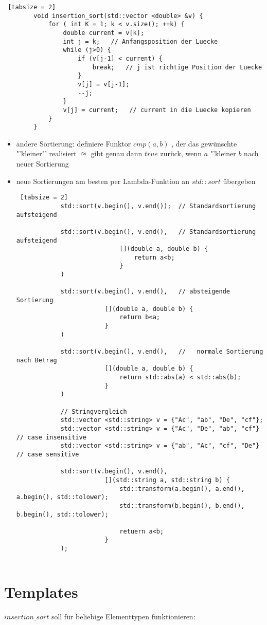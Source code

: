 \documentclass{article}
\begin{document}
	\begin{lstlisting} [tabsize = 2]
		void insertion_sort(std::vector <double> &v) {
			for ( int K = 1; k < v.size(); ++k) {
				double current = v[k];
				int j = k;   // Anfangsposition der Luecke
				while (j>0) {
					if (v[j-1] < current) {
						break;   // j ist richtige Position der Luecke
					}
					v[j] = v[j-1];
					--j;
				}
				v[j] = current;   // current in die Luecke kopieren
			}
		}
	\end{lstlisting}
	\begin{itemize}
		\item andere Sortierung: definiere Funktor $cmp(a,b)$ , der das gewünschte "'kleiner"' realisiert $\approxeq$ gibt genau dann $true$ zurück, wenn $a$ "'kleiner $b$ nach neuer Sortierung
		\item neue Sortierungen am besten per Lambda-Funktion an $std::sort$ übergeben
		\begin{lstlisting} [tabsize = 2]
			std::sort(v.begin(), v.end());  // Standardsortierung aufsteigend
			
			std::sort(v.begin(), v.end(),   // Standardsortierung aufsteigend
							[](double a, double b) {
								return a<b;
							}
			)
			
			std::sort(v.begin(), v.end(),   // absteigende Sortierung
						[](double a, double b) {
							return b<a;
						}
			)
						
			std::sort(v.begin(), v.end(),   //   normale Sortierung nach Betrag
						[](double a, double b) {
							return std::abs(a) < std::abs(b);
						}
			)
			
			// Stringvergleich 
			std::vector <std::string> v = {"Ac", "ab", "De", "cf"};  
			std::vector <std::string> v = {"Ac", "De", "ab", "cf"}  // case insensitive
			std::vector <std::string> v = {"ab", "Ac", "cf", "De"}  // case sensitive
			
			std::sort(v.begin(), v.end(), 
						[](std::string a, std::string b) {
							std::transform(a.begin(), a.end(), a.begin(), std::tolower);
							std::transform(b.begin(), b.end(), b.begin(), std::tolower);
							
							retuern a<b;
						}
			);
			
		\end{lstlisting}
	\end{itemize}
	
	\section{Templates}
	$insertion\_sort$ soll für beliebige Elementtypen funktionieren:
	
\end{document}
